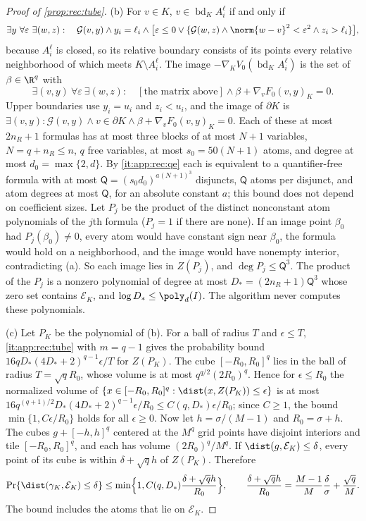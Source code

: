 \begin{proof}[Proof of \cref{prop:rec:tube}]
(b) For $v\in K$, $v\in\operatorname{bd}_KA_i^\ell$ if and only if
\[
 \exists y\ \forall\varepsilon\ \exists(w,z):\quad\mathcal G(v,y)\wedge
 y_i=\ell_i\wedge\bigl[\varepsilon\le0\vee\{\mathcal G(w,z)\wedge
 \norm{w-v}^2<\varepsilon^2\wedge z_i>\ell_i\}\bigr],
\]
because $A_i^\ell$ is closed, so its relative boundary consists of its points
every relative neighborhood of which meets $K\setminus A_i^\ell$. The image
$-\nabla_KV_0(\operatorname{bd}_KA_i^\ell)$ is the set of $\beta\in\R^q$ with
\[
 \exists(v,y)\ \forall\varepsilon\ \exists(w,z):\quad
 [\text{the matrix above}]\wedge\beta+\nabla_vF_0(v,y)_K=0 .
\]
Upper boundaries use $y_i=u_i$ and $z_i<u_i$, and the image of $\partial K$
is $\exists(v,y):\mathcal G(v,y)\wedge v\in\partial K\wedge
\beta+\nabla_vF_0(v,y)_K=0$. Each of these at most $2n_R+1$ formulas has at most
three blocks of at most $N+1$ variables, $N=q+n_R\le n$, $q$ free variables, at
most $s_0=50(N+1)$ atoms, and degree at most $d_0=\max\{2,d\}$. By
\ref{it:app:rec:qe} each is equivalent to a quantifier-free formula with at
most $\mathsf Q=(s_0d_0)^{a(N+1)^3}$ disjuncts, $\mathsf Q$ atoms per
disjunct, and atom degrees at most $\mathsf Q$, for an absolute constant $a$;
this bound does not depend on coefficient sizes. Let $P_j$ be the product of
the distinct nonconstant atom polynomials of the $j$th formula ($P_j=1$ if
there are none). If an image point $\beta_0$ had $P_j(\beta_0)\ne0$, every atom
would have constant sign near $\beta_0$, the formula would hold on a
neighborhood, and the image would have nonempty interior, contradicting (a).
So each image lies in $Z(P_j)$, and $\deg P_j\le\mathsf Q^3$. The product of
the $P_j$ is a nonzero polynomial of degree at most
$D_*=(2n_R+1)\mathsf Q^3$ whose zero set contains $\mathcal E_K$, and
$\log D_*\le\poly_d(I)$. The algorithm never computes these polynomials.

(c) Let $P_K$ be the polynomial of (b). For a ball of radius $T$ and
$\epsilon\le T$, \ref{it:app:rec:tube} with $m=q-1$ gives the probability bound
$16qD_*(4D_*+2)^{q-1}\epsilon/T$ for $Z(P_K)$. The cube $[-R_0,R_0]^q$ lies in
the ball of radius $T=\sqrt qR_0$, whose volume is at most $q^{q/2}(2R_0)^q$.
Hence for $\epsilon\le R_0$ the normalized volume of
$\{x\in[-R_0,R_0]^q:\dist(x,Z(P_K))\le\epsilon\}$ is at most
$16q^{(q+1)/2}D_*(4D_*+2)^{q-1}\epsilon/R_0\le C(q,D_*)\epsilon/R_0$; since
$C\ge1$, the bound $\min\{1,C\epsilon/R_0\}$ holds for all $\epsilon\ge0$.
Now let $h=\sigma/(M-1)$ and $R_0=\sigma+h$. The cubes $g+[-h,h]^q$ centered at
the $M^q$ grid points have disjoint interiors and tile $[-R_0,R_0]^q$, and each
has volume $(2R_0)^q/M^q$. If $\dist(g,\mathcal E_K)\le\delta$, every point
of its cube is within $\delta+\sqrt qh$ of $Z(P_K)$. Therefore
\[
 \Pr\{\dist(\gamma_K,\mathcal E_K)\le\delta\}\le
 \min\Bigl\{1,C(q,D_*)\frac{\delta+\sqrt qh}{R_0}\Bigr\},\qquad
 \frac{\delta+\sqrt qh}{R_0}=\frac{M-1}M\frac\delta\sigma+\frac{\sqrt q}M .
\]
The bound includes the atoms that lie on $\mathcal E_K$.
\end{proof}


